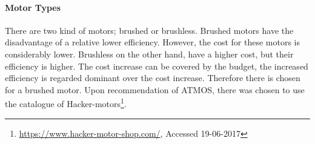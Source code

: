 \paragraph{Motor Types} There are two kind of motors; brushed or brushless. Brushed motors have the disadvantage of a relative lower efficiency. However, the cost for these motors is considerably lower. Brushless on the other hand, have a higher cost, but their efficiency is higher. The cost increase can be covered by the budget, the increased efficiency is regarded dominant over the cost increase. Therefore there is chosen for a brushed motor. Upon recommendation of ATMOS, there was chosen to use the catalogue of Hacker-motors\footnote{\url{https://www.hacker-motor-shop.com/}, Accessed 19-06-2017}.\\
